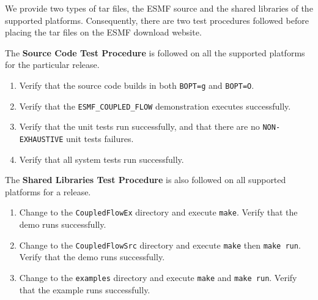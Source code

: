 We provide two types of tar files, the ESMF source and the shared
libraries of the supported platforms. Consequently, there are two test
procedures followed before placing the tar files on the ESMF download website. 

The {\bf Source Code Test Procedure} is followed on all the supported
platforms for the particular release.

\begin{enumerate}
\item Verify that the source code builds in both {\tt BOPT=g} and {\tt BOPT=O}.
\item Verify that  the {\tt ESMF\_COUPLED\_FLOW} demonstration executes successfully.
\item Verify that the unit tests run successfully, and that there are no {\tt NON-EXHAUSTIVE} unit tests  failures.
\item Verify that all system tests run successfully. 
\end{enumerate}

The {\bf Shared Libraries Test Procedure} is also followed on all supported
platforms for a release.

\begin{enumerate}
\item Change to the {\tt CoupledFlowEx} directory and execute {\tt make}. Verify that the demo runs successfully.
\item Change to the {\tt CoupledFlowSrc} directory and execute {\tt make} then {\tt make run}. Verify that the demo runs successfully.
\item Change to the {\tt examples} directory and execute {\tt make} and {\tt make run}. Verify that the example runs successfully.
\end{enumerate}














